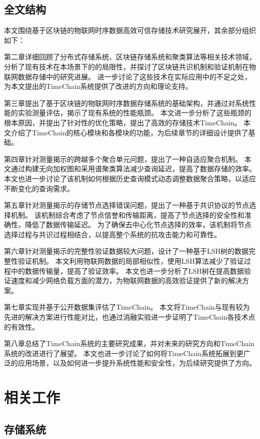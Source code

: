 \section{全文结构}
本文围绕基于区块链的物联网时序数据高效可信存储技术研究展开，其余部分组织如下：

第二章详细回顾了分布式存储系统、区块链存储系统和聚类算法等相关技术领域，分析了现有技术在本场景下的的局限性，并探讨了区块链共识机制和验证机制在物联网数据存储中的研究进展。
进一步讨论了这些技术在实际应用中的不足之处，为本文提出的TimeChain系统提供了改进的方向和理论支持。

第三章提出了基于区块链的物联网时序数据存储系统的基础架构，并通过对系统性能的实验测量评估，揭示了现有系统的性能瓶颈。
本文进一步分析了这些瓶颈的根本原因，并提出了针对性的优化策略，提出了高效的存储技术TimeChain。
本文介绍了TimeChain的核心模块和各模块的功能，为后续章节的详细设计提供了基础。

第四章针对测量揭示的跨越多个聚合单元问题，提出了一种自适应聚合机制。
本文通过构建无向加权图和采用谱聚类算法减少查询延迟，提高了数据存储的效率。
本文也进一步讨论了该机制如何根据历史查询模式动态调整数据聚合策略，以适应不断变化的查询需求。

第五章针对测量揭示的存储节点选择错误问题，提出了一种基于共识协议的节点选择机制。
该机制综合考虑了节点信誉和传输距离，提高了节点选择的安全性和准确性，降低了数据传输延迟。
为了确保去中心化节点选择的效率，该机制将节点选择过程与共识过程相结合，以提高整个系统的抗攻击能力和可靠性。

第六章针对测量揭示的完整性验证数据较大问题，设计了一种基于LSH树的数据完整性验证机制。
本文利用物联网数据的局部相似性，使用LSH算法减少了验证过程中的数据传输量，提高了验证效率。
本文也进一步分析了LSH树在提高数据验证速度和减少网络负载方面的潜力，为物联网数据的高效验证提供了新的解决方案。

第七章实现并基于公开数据集评估了TimeChain。
本文将TimeChain与现有较为先进的解决方案进行性能对比，也通过消融实验进一步证明了TimeChain各技术点的有效性。

第八章总结了TimeChain系统的主要研究成果，并对未来的研究方向和TimeChain系统的改进进行了展望。
本文也进一步讨论了如何将TimeChain系统拓展到更广泛的应用场景，以及如何进一步提升系统性能和安全性，为后续研究提供了方向。

\chapter{相关工作}
\section{存储系统}

